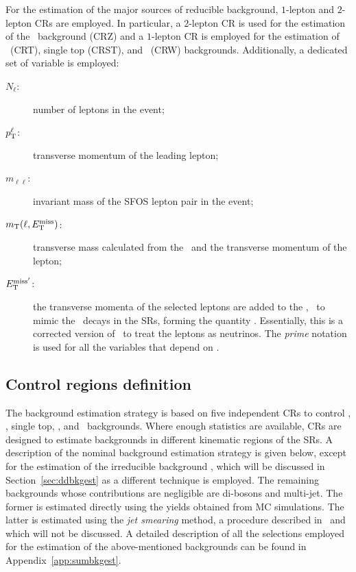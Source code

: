 		For the estimation of the major sources of reducible background, $1$-lepton and $2$-lepton \acp{CR} are employed. In particular, a $2$-lepton \ac{CR} is used for the estimation of the \Zjets\ background (CRZ) and a $1$-lepton \ac{CR} is employed for the estimation of \ttbar\ (CRT), single top (CRST), and \Wjets\ (CRW) backgrounds. Additionally, a dedicated set of variable is employed:

		\begin{description}
			\item[\boldmath $N_{\ell}$:] number of leptons in the event;
			\item[\boldmath $p_{\mathrm{T}}^{\ell}$:] transverse momentum of the leading lepton;
			\item[\boldmath $m_{\ell\ell}$:] invariant mass of the \ac{SFOS} lepton pair in the event;
			\item[\boldmath $m_{\mathrm{T}}(\ell,E_{\mathrm{T}}^{\mathrm{miss}})$:] transverse mass calculated from the \met\ and the transverse momentum of the lepton;  
			\item[\boldmath $E_{\mathrm{T}}^{\mathrm{miss'}}$:] the transverse momenta of the selected leptons are added to the \ptmiss, \eg\ to mimic the \Znunu\ decays in the \acp{SR}, forming the quantity \metprime. Essentially, this is a corrected version of \met\ to treat the leptons as neutrinos. The \emph{prime} notation is used for all the variables that depend on \metprime.
		\end{description}


		\subsection{Control regions definition}
		\label{subsec:crs}

			The background estimation strategy is based on five independent \acp{CR} to control \Zjets, \ttbar, single top, \Wjets, and \ttZ\ backgrounds. Where enough statistics are available, \acp{CR} are designed to estimate backgrounds in different kinematic regions of the \acp{SR}. A description of the nominal background estimation strategy is given below, except for the estimation of the irreducible background \ttZ, which will be discussed in Section~\ref{sec:ddbkgest} as a different technique is employed. The remaining backgrounds whose contributions are negligible are di-bosons and multi-jet. The former is estimated directly using the yields obtained from \ac{MC} simulations. The latter is estimated using the \emph{jet smearing} method, a procedure described in~\cite{Aad:2012fqa} and~\cite{calumThesis} which will not be discussed. A detailed description of all the selections employed for the estimation of the above-mentioned backgrounds can be found in Appendix~\ref{app:sumbkgest}. 

